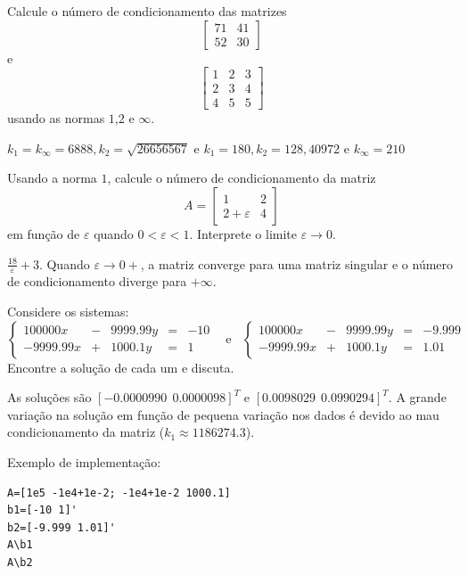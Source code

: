 \begin{exer} Calcule o número de condicionamento das matrizes
$$\left[
\begin{array}{cc}
71 & 41\\
52 & 30
\end{array}\right]$$
e
$$\left[
\begin{array}{ccc}
1 & 2 & 3\\
2 & 3 & 4\\
4 & 5 & 5
\end{array}\right]$$
usando as normas $1$,$2$ e $\infty$.
\end{exer}
\begin{resp}
  
$k_1=k_\infty=6888, k_2=\sqrt{26656567}$ e $k_1=180, k_2= 128,40972  $ e $k_\infty=210$    
  
\end{resp}

\begin{exer}Usando a norma $1$, calcule o número de condicionamento da matriz
$$A=\left[
\begin{array}{cc}
1 & 2\\
2+\varepsilon & 4
\end{array}\right]$$
em função de $\varepsilon$ quando $0<\varepsilon<1$. Interprete o limite $\varepsilon\to 0$.
\end{exer}
\begin{resp}
  
 $\frac{18}{\varepsilon}+3$. Quando $\varepsilon\to 0+$, a matriz converge para uma matriz singular e o número de condicionamento diverge para $+\infty$.    
  
\end{resp}

\begin{exer} Considere os sistemas:
$$
\left\{
\begin{array}{rclcl}
100000 x  &-& 9999.99 y  &=&-10\\
-9999.99 x &+&  1000.1 y &=&1
\end{array}\right. ~~~~\text{e}~~~~
\left\{
\begin{array}{rclcl}
100000 x  &-& 9999.99 y  &=&-9.999\\
-9999.99 x &+&  1000.1 y &=&1.01
\end{array}\right.
$$
Encontre a solução de cada um e discuta.
\end{exer}
\begin{resp}
  
As soluções são $[-0.0000990 ~~ 0.0000098]^T$ e $[0.0098029 ~~ 0.0990294]^T$. A grande variação na solução em função de pequena variação nos dados é devido ao mau condicionamento da matriz ($k_1\approx 1186274.3 $).

Exemplo de implementação:
\begin{verbatim}
A=[1e5 -1e4+1e-2; -1e4+1e-2 1000.1]
b1=[-10 1]'
b2=[-9.999 1.01]'
A\b1
A\b2
\end{verbatim}    
  
\end{resp}

